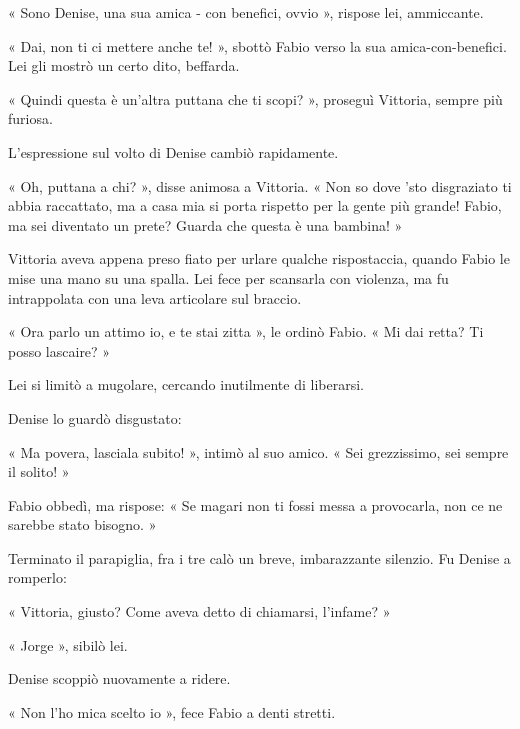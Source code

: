 « Sono Denise, una sua amica - con benefici, ovvio », rispose lei, ammiccante.

« Dai, non ti ci mettere anche te! », sbottò Fabio verso la sua amica-con-benefici. Lei gli mostrò un certo dito, beffarda.

« Quindi questa è un'altra puttana che ti scopi? », proseguì Vittoria, sempre più furiosa.

L'espressione sul volto di Denise cambiò rapidamente.

« Oh, puttana a chi? », disse animosa a Vittoria. « Non so dove 'sto disgraziato ti abbia raccattato, ma a casa mia si porta rispetto per la gente più grande! Fabio, ma sei diventato un prete? Guarda che questa è una bambina! »

Vittoria aveva appena preso fiato per urlare qualche rispostaccia, quando Fabio le mise una mano su una spalla. Lei fece per scansarla con violenza, ma fu intrappolata con una leva articolare sul braccio.

« Ora parlo un attimo io, e te stai zitta », le ordinò Fabio. « Mi dai retta? Ti posso lascaire? » 

Lei si limitò a mugolare, cercando inutilmente di liberarsi. 

Denise lo guardò disgustato: 

« Ma povera, lasciala subito! », intimò al suo amico. « Sei grezzissimo, sei sempre il solito! »

Fabio obbedì, ma rispose: « Se magari non ti fossi messa a provocarla, non ce ne sarebbe stato bisogno. »

Terminato il parapiglia, fra i tre calò un breve, imbarazzante silenzio. Fu Denise a romperlo:

« Vittoria, giusto? Come aveva detto di chiamarsi, l'infame? »

« Jorge », sibilò lei.

Denise scoppiò nuovamente a ridere.

« Non l'ho mica scelto io », fece Fabio a denti stretti.

